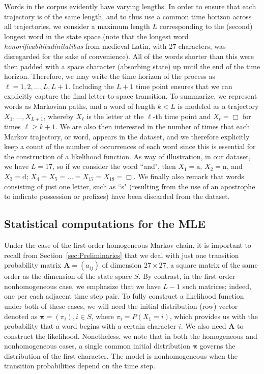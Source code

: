 \documentclass[11pt, a4paper]{article}
\numberwithin{equation}{section}
\theoremstyle{plain}
\theoremstyle{definition}
\begin{document}
Words in the corpus evidently have varying lengths. In order to ensure that each trajectory is of the same length, and to thus use a common time horizon across all trajectories, we consider a maximum length $L$ corresponding to the (second) longest word in the state space (note that the longest word \textit{honorificabilitudinitatibus} from medieval Latin, with 27 characters, was disregarded for the sake of convenience). All of the words shorter than this were then padded with a space character (absorbing state) up until the end of the time horizon. Therefore, we may write the time horizon of the process as $\ell = 1, 2, \dots, L, L+1$.  Including the $L+1$ time point ensures that we can explicitly capture the final letter-to-space transition. To summarize, we represent words as Markovian paths, and a word of length $k < L$ is modeled as a trajectory $X_1, \dots, X_{L+1}$, whereby $X_\ell$ is the letter at the $\ell$-th time point and $X_t = \mathcal\Box$ for times $\ell\geq k+1$.  We are also then interested in the number of times that each Markov trajectory, or word, appears in the dataset, and we therefore explicitly keep a count of the number of occurrences of each word since this is essential for the construction of a likelihood function. As way of illustration, in our dataset, we have $L=17$, so if we consider the word ``and", then $X_1 = \text{a}$, $X_2 = \text{n}$, and $X_3=\text{d}$; $X_4 = X_5 = \dots = X_{17} = X_{18} = \mathcal\Box$. We finally also remark that words consisting of just one letter, such as ``s" (resulting from the use of an apostrophe to indicate possession or prefixes) have been discarded from the dataset. 

\subsection{Statistical computations for the MLE}\label{subsec:mle_stat_comp} 

Under the case of  the first-order homogeneous Markov chain, it is important to recall from Section~\ref{sec:Preliminaries} that we deal with just one transition probability matrix $\mathbf{A} =(a_{ij})$ 
of dimension ${27\times27}$, a square matrix of the same order as the dimension of the state space $S$. By contrast, in the first-order nonhomogeneous case, we emphasize that we have $L-1$ such matrices; indeed, one per each adjacent time step pair. To fully construct a likelihood function under both of these cases, we will need the initial distribution (row) vector denoted as $\boldsymbol{\pi} = (\pi_{i}), i \in S$, where $\pi_{i}=P(X_1=i)$, which provides us with the probability that a word  begins with a certain character $i$. We also need $\mathbf{A}$ to construct the likelihood. Nonetheless, we note that in both the homogeneous and nonhomogeneous cases, a single common initial distribution $\boldsymbol{\pi}$ governs the distribution of the first character. The model is nonhomogeneous when the transition probabilities depend on the time step.
\end{document}
